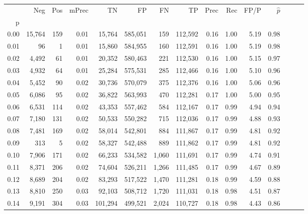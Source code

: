 \begin{tabular}{rrrrrrrrrrrrrrr}
\toprule
{} &     Neg &    Pos & mPrec &       TN &       FP &       FN &       TP &  Prec &   Rec &  FP/P & $\hat{p}$ \\
p    &         &        &       &          &          &          &          &       &       &       &           \\
\midrule
0.00 &  15,764 &    159 &  0.01 &   15,764 &  585,051 &      159 &  112,592 &  0.16 &  1.00 &  5.19 &      0.98 \\
0.01 &      96 &      1 &  0.01 &   15,860 &  584,955 &      160 &  112,591 &  0.16 &  1.00 &  5.19 &      0.98 \\
0.02 &   4,492 &     61 &  0.01 &   20,352 &  580,463 &      221 &  112,530 &  0.16 &  1.00 &  5.15 &      0.97 \\
0.03 &   4,932 &     64 &  0.01 &   25,284 &  575,531 &      285 &  112,466 &  0.16 &  1.00 &  5.10 &      0.96 \\
0.04 &   5,452 &     90 &  0.02 &   30,736 &  570,079 &      375 &  112,376 &  0.16 &  1.00 &  5.06 &      0.96 \\
0.05 &   6,086 &     95 &  0.02 &   36,822 &  563,993 &      470 &  112,281 &  0.17 &  1.00 &  5.00 &      0.95 \\
0.06 &   6,531 &    114 &  0.02 &   43,353 &  557,462 &      584 &  112,167 &  0.17 &  0.99 &  4.94 &      0.94 \\
0.07 &   7,180 &    131 &  0.02 &   50,533 &  550,282 &      715 &  112,036 &  0.17 &  0.99 &  4.88 &      0.93 \\
0.08 &   7,481 &    169 &  0.02 &   58,014 &  542,801 &      884 &  111,867 &  0.17 &  0.99 &  4.81 &      0.92 \\
0.09 &     313 &      5 &  0.02 &   58,327 &  542,488 &      889 &  111,862 &  0.17 &  0.99 &  4.81 &      0.92 \\
0.10 &   7,906 &    171 &  0.02 &   66,233 &  534,582 &    1,060 &  111,691 &  0.17 &  0.99 &  4.74 &      0.91 \\
0.11 &   8,371 &    206 &  0.02 &   74,604 &  526,211 &    1,266 &  111,485 &  0.17 &  0.99 &  4.67 &      0.89 \\
0.12 &   8,689 &    204 &  0.02 &   83,293 &  517,522 &    1,470 &  111,281 &  0.18 &  0.99 &  4.59 &      0.88 \\
0.13 &   8,810 &    250 &  0.03 &   92,103 &  508,712 &    1,720 &  111,031 &  0.18 &  0.98 &  4.51 &      0.87 \\
0.14 &   9,191 &    304 &  0.03 &  101,294 &  499,521 &    2,024 &  110,727 &  0.18 &  0.98 &  4.43 &      0.86 \\

\end{tabular}
